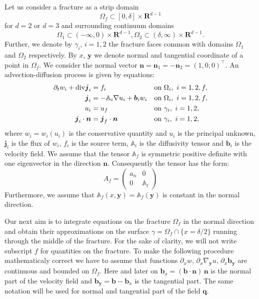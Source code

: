 \documentclass[12pt,a4paper]{report}
\def\prtl{\partial}
\def\vc#1{\mathbf{\boldsymbol{#1}}}     %
\def\tn#1{{\mathbb{#1}}}    %
\def\div{{\rm div}}
\def\grad{\nabla}
\def\Real{{\mathbf R}}
\begin{document}
Let us consider a fracture as a strip domain 
\[
 \Omega_f \subset [0,\delta] \times \Real^{d-1}
\]
for $d=2$ or $d=3$ and surrounding continuum domains
\[
 \Omega_1 \subset (-\infty,0)\times \Real^{d-1},
 \Omega_2 \subset (\delta,\infty)\times \Real^{d-1}.
\]
Further, we denote by $\gamma_i$, $i=1,2$ the fracture faces common with domains $\Omega_1$ and $\Omega_2$ respectively.
By $x$, $\vc y$ we denote normal and tangential coordinate of a point in $\Omega_f$. 
We consider the normal vector  $\vc n=\vc n_1=-\vc n_2=(1,0,0)^\top$.
An advection-diffusion process is given by equations:
\begin{align}
  \label{eq:fr:continuity}
  \prtl_t w_i + \div \vc j_i &= f_i&&  \text{on } \Omega_i,\ i=1,2,f,\\
  \label{eq:fr:flux}
  \vc j_i &= - \tn A_i\grad u_i + \vc b_i w_i&& \text{on } \Omega_i,\ i=1,2,f,\\
  \label{eq:fr:Dirichlet}
  u_i &= u_f&& \text{on } \gamma_i,\ i=1,2,\\
  \label{eq:fr:Neumann}
  \vc j_i \cdot \vc n &= \vc j_f \cdot \vc n&& \text{on } \gamma_i,\ i=1,2,
\end{align}
where $w_i=w_i(u_i)$ is the conservative quantity and $u_i$ is the principal unknown, $\vc j_i$ is the flux of $w_i$, $f_i$ is the source term,
$\tn A_i$ is the diffusivity tensor and $\vc b_i$ is the velocity field. We assume that the tensor $\tn A_f$ is symmetric positive definite 
with one eigenvector in the direction $\vc n$. Consequently the tensor has the form:
\[
 A_f = \begin{pmatrix} 
            a_n & 0  \\
            0 & \tn A_t
       \end{pmatrix}
\]
Furthermore, we assume that $\tn A_f(x, \vc y)=\tn A_f(\vc y)$ is constant in the normal direction.

Our next aim is to integrate equations on the fracture $\Omega_f$ in the normal direction 
and obtain their approximations on the surface $\gamma=\Omega_f \cap \{x=\delta/2\}$ running through the middle of the fracture. 
For the sake of clarity, we will not write subscript $f$ for quantities on the fracture. 
To make the following procedure mathematicaly correct we have to assume that functions
$\prtl_x w$, $\prtl_x \grad_{\vc y} u$, $\prtl_x \vc b_{\vc y}$ are continuous and bounded on $\Omega_f$. Here and later on 
$\vc b_x=(\vc b \cdot \vc n)\, \vc n$ is the normal part of the velocity field and $\vc b_{\vc y} = \vc b - \vc b_x$ is the tangential part.
The same notation will be used for normal and tangential part of the field $\vc q$.
\end{document}
